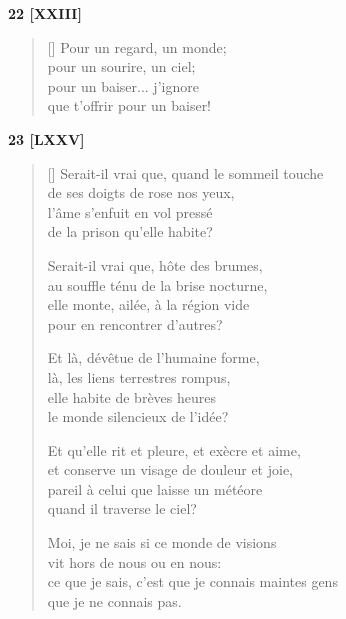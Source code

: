 \documentclass[a4paper,12pt]{book}
\begin{document}
\bigskip

\begin{center}
  \textbf{22 [XXIII]}
\end{center}

\settowidth{\versewidth}{que t'offrir pour un baiser!}

\begin{verse}[\versewidth]
  Pour un regard, un monde; \\
  pour un sourire, un ciel; \\
  pour un baiser... j'ignore \\
  que t'offrir pour un baiser!
\end{verse}

\bigskip

\begin{center}
  \textbf{23 [LXXV]}
\end{center}

\settowidth{\versewidth}{ce que je sais, c'est que je connais maintes gens}

\begin{verse}[\versewidth]
  Serait-il vrai que, quand le sommeil touche \\
  de ses doigts de rose nos yeux, \\
  l'âme s'enfuit en vol pressé \\
  de la prison qu'elle habite?

  Serait-il vrai que, hôte des brumes, \\
  au souffle ténu de la brise nocturne, \\
  elle monte, ailée, à la région vide \\
  pour en rencontrer d'autres?

  Et là, dévêtue de l'humaine forme, \\
  là, les liens terrestres rompus, \\
  elle habite de brèves heures \\
  le monde silencieux de l'idée?

  Et qu'elle rit et pleure, et exècre et aime, \\
  et conserve un visage de douleur et joie, \\
  pareil à celui que laisse un météore \\
  quand il traverse le ciel?

  Moi, je ne sais si ce monde de visions \\
  vit hors de nous ou en nous: \\
  ce que je sais, c'est que je connais maintes gens \\
  que je ne connais pas.
\end{verse}
\end{document}
